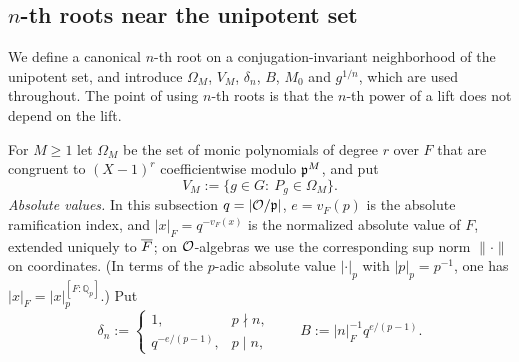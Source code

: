 \subsection{$n$-th roots near the unipotent set}\label{II:subsec:roots}
We define a canonical $n$-th root on a conjugation-invariant neighborhood of the unipotent set, and introduce $\Omega_M$, $V_M$, $\delta_n$, $B$, $M_0$ and $g^{1/n}$, which are used throughout. The point of using $n$-th roots is that the $n$-th power of a lift does not depend on the lift.

For $M\ge1$ let $\Omega_M$ be the set of monic polynomials of degree $r$ over $F$ that are congruent to $(X-1)^r$ coefficientwise modulo $\mathfrak{p}^M$, and put
\[ V_M:=\{g\in G:\ P_g\in\Omega_M\}. \]
\emph{Absolute values.} In this subsection $q=|\mathcal{O}/\mathfrak{p}|$, $e=v_F(p)$ is the absolute ramification index, and $|x|_F=q^{-v_F(x)}$ is the normalized absolute value of $F$, extended uniquely to $\overline{F}$; on $\mathcal{O}$-algebras we use the corresponding sup norm $\|\cdot\|$ on coordinates. (In terms of the $p$-adic absolute value $|\cdot|_p$ with $|p|_p=p^{-1}$, one has $|x|_F=|x|_p^{[F:\mathbb Q_p]}$.) Put
\[ \delta_n:=\begin{cases}1,&p\nmid n,\\ q^{-e/(p-1)},&p\mid n,\end{cases}\qquad B:=|n|_F^{-1}q^{e/(p-1)}. \]

